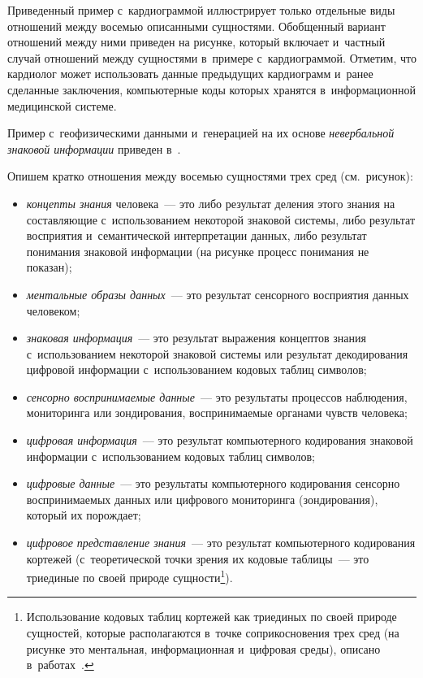 \begin{multicols}{2}
  Приведенный пример с~кардиограммой ил\-люст\-ри\-ру\-ет только отдельные 
виды отношений между восемью описанными сущностями. Обобщенный 
вариант отношений между ними приведен на рисунке, который включает 
и~част\-ный случай отношений между сущностями в~примере с~кардиограммой. 
Отметим, что кардиолог может использовать данные предыдущих кардиограмм 
и~ранее сделанные заключения, компьютерные коды которых хранятся 
в~информационной медицинской сис\-теме.
{

}

 Пример с~геофизическими данными и~генерацией на их основе \textit{невербальной знаковой информации} приведен 
в~\cite{37-zac}.
  
  Опишем кратко отношения между восемью сущностями трех сред (см.\ рисунок):
  \begin{itemize}
\item \textit{концепты знания} человека~--- это либо результат деления этого 
знания на составляющие с~использованием некоторой знаковой системы, 
либо результат восприятия и~семантической интерпретации данных, либо 
результат понимания знаковой информации (на рисунке процесс понимания 
не показан);
\item \textit{ментальные образы данных}~--- это результат сенсорного 
восприятия данных человеком;
\item \textit{знаковая информация}~--- это результат вы\-ра\-жения концептов 
знания с~использованием не\-которой знаковой сис\-те\-мы или результат 
де\-кодирования цифровой информации с~\mbox{использованием} кодовых таб\-лиц 
символов;
\item \textit{сенсорно воспринимаемые данные}~--- это результаты процессов 
наблюдения, мониторинга или зондирования, воспринимаемые органами 
чувств человека;
\item \textit{цифровая информация}~--- это результат компьютерного 
кодирования знаковой информации с~использованием кодовых таблиц 
символов;
\item \textit{цифровые данные}~--- это результаты компьютерного 
кодирования сенсорно воспринимаемых данных или циф\-ро\-во\-го мониторинга 
(зондирования), который их порождает;
\item \textit{цифровое представление знания}~--- это результат 
компьютерного кодирования кортежей (с~теоретической точки зрения их 
кодовые таб\-ли\-цы~--- это триединые по своей природе 
сущности\footnote{Использование кодовых таб\-лиц кортежей как триединых по своей 
природе сущностей, которые располагаются в~точке соприкосновения трех сред (на рисунке это 
ментальная, информационная и~цифровая среды), описано в~работах~\cite{31-zac, 35-zac}.}).
\end{itemize}


\end{multicols}

